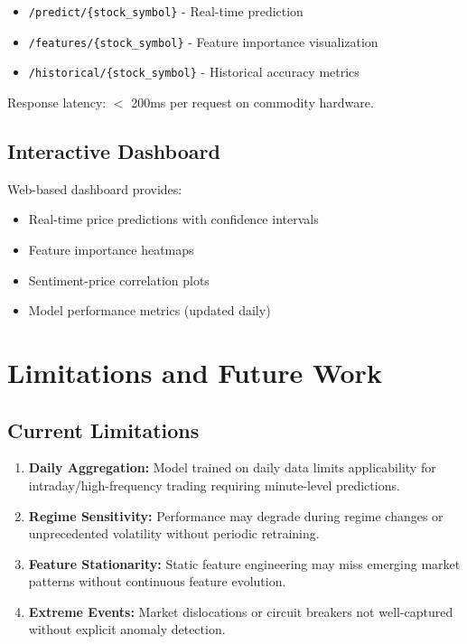 \documentclass[conference]{IEEEtran}
\begin{document}
\begin{itemize}
\item \texttt{/predict/\{stock\_symbol\}} - Real-time prediction
\item \texttt{/features/\{stock\_symbol\}} - Feature importance visualization
\item \texttt{/historical/\{stock\_symbol\}} - Historical accuracy metrics
\end{itemize}

Response latency: $<$ 200ms per request on commodity hardware.

\subsection{Interactive Dashboard}

Web-based dashboard provides:
\begin{itemize}
\item Real-time price predictions with confidence intervals
\item Feature importance heatmaps
\item Sentiment-price correlation plots
\item Model performance metrics (updated daily)
\end{itemize}

\section{Limitations and Future Work}

\subsection{Current Limitations}

\begin{enumerate}
\item \textbf{Daily Aggregation:} Model trained on daily data limits applicability for intraday/high-frequency trading requiring minute-level predictions.

\item \textbf{Regime Sensitivity:} Performance may degrade during regime changes or unprecedented volatility without periodic retraining.

\item \textbf{Feature Stationarity:} Static feature engineering may miss emerging market patterns without continuous feature evolution.

\item \textbf{Extreme Events:} Market dislocations or circuit breakers not well-captured without explicit anomaly detection.
\end{enumerate}
\end{document}

